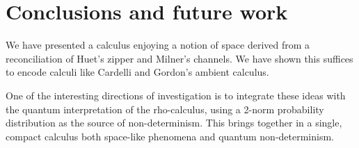 \section{Conclusions and future work}

We have presented a calculus enjoying a notion of space derived from a
reconciliation of Huet's zipper and Milner's channels. We have shown
this suffices to encode calculi like Cardelli and Gordon's ambient
calculus.

One of the interesting directions of investigation is to integrate
these ideas with the quantum interpretation of the rho-calculus, using
a 2-norm probability distribution as the source of non-determinism. This brings together in a single, compact calculus both space-like phenomena and quantum non-determinism.





